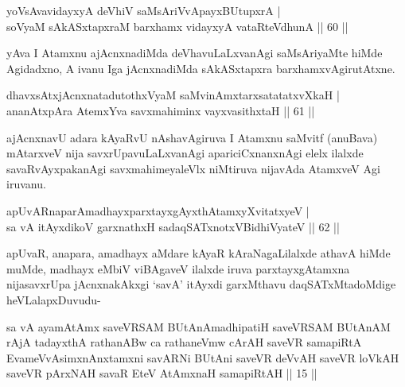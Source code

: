 \begin{shl}
yoV\s sAvavidayxyA deVhiV saMsAriVvApayxBUtupxrA |\\
soV\s yaM sAkASxtapxraM barxhamx vidayxyA vataRteV\s dhunA \hfill || 60 ||
\end{shl} 

\begin{artha}
yAva I Atamxnu ajAcnxnadiMda deVhavuLaLxvanAgi saMsAriyaMte hiMde Agidadxno, A ivanu Iga jAcnxnadiMda sAkASxtapxra barxhamxvAgirutAtxne.
\end{artha}


\begin{shl}
dhavxsAtxjAcnxnatadutothxVyaM saMvinAmxtarxsatatatxvXkaH |\\
ananAtxpAra AtemxYva savxmahiminx vayxvasithxtaH \hfill || 61 ||
\end{shl}

\begin{artha}
ajAcnxnavU adara kAyaRvU nAshavAgiruva I Atamxnu saMvitf (anuBava) mAtarxveV nija savxrUpavuLaLxvanAgi apariciCxnanxnAgi elelx ilalxde savaRvAyxpakanAgi savxmahimeyaleVlx niMtiruva nijavAda AtamxveV Agi iruvanu.
\end{artha}


\begin{shl}
apUvARnaparAmadhayxparxtayxgAyxthAtamxyXvitatxyeV |\\
sa vA itAyxdikoV garxnathxH sadaqSATxnotxV\s BidhiVyateV \hfill || 62 ||
\end{shl}

\begin{artha}
apUvaR, anapara, amadhayx aMdare kAyaR kAraNagaLilalxde athavA hiMde
muMde, madhayx eMbiV viBAgaveV ilalxde iruva parxtayxgAtamxna
nijasavxrUpa jAcnxnakAkxgi `savA' itAyxdi garxMthavu daqSATxMtadoMdige
heVLalapxDuvudu-
\end{artha}


\begin{kandikeshl}
sa vA ayamAtAmx saveVRSAM BUtAnAmadhipatiH saveVRSAM BUtAnAM rAjA tadayxthA rathanABw ca rathaneVmw cArAH saveVR samapiRtA EvameVvAsimxnAnxtamxni savARNi BUtAni saveVR deVvAH saveVR loVkAH saveVR pArxNAH savaR EteV AtAmxnaH samapiRtAH || 15 ||
\end{kandikeshl}

